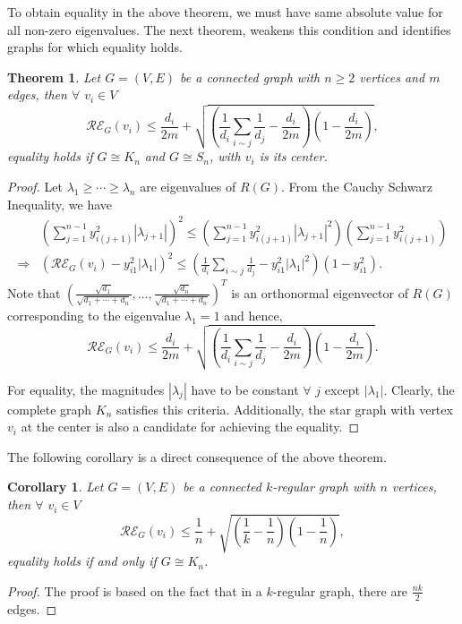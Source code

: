 \documentclass[10 pt]{article}
\newtheorem{theorem}{Theorem}[section]
\newtheorem{corollary}{Corollary}[section]
\numberwithin{equation}{section}
\begin{document}
To obtain equality in the above theorem, we must have same absolute value for all non-zero eigenvalues. The next theorem, weakens this condition and identifies graphs for which equality holds.
\begin{theorem}
Let $G=(V,E)$ be a connected graph with $n\geq 2$ vertices and $m$ edges, then $\forall$ $v_i\in V$
$$\mathcal{RE}_G(v_i)\leq \frac{d_i}{2m}+\sqrt{\left(\frac{1}{d_i}\sum\limits_{i\sim j}\frac{1}{d_j}-\frac{d_i}{2m}\right)\left(1-\frac{d_i}{2m}\right)},$$
equality holds if $G\cong K_n$ and $G\cong S_n$, with $v_i$ is its center.
\end{theorem}
\begin{proof}
Let $\lambda_1 \geq \cdots \geq \lambda_n$ are eigenvalues of $R(G)$. From the Cauchy Schwarz Inequality, we have
\begin{align*}
&\left(\sum\limits_{j=1}^{n-1}y^2_{i(j+1)}|\lambda_{j+1}|\right)^2\leq \left(\sum\limits_{j=1}^{n-1}y^2_{i(j+1)}|\lambda_{j+1}|^2\right)\left(\sum\limits_{j=1}^{n-1}y^2_{i(j+1)}\right)\\
\Rightarrow &\left(\mathcal{RE}_G(v_i)-y^2_{i1}|\lambda_{1}|\right)^2\leq \left(\frac{1}{d_i}\sum\limits_{i\sim j}\frac{1}{d_j}-y^2_{i1}|\lambda_{1}|^2\right)\left(1-y^2_{i1}\right).
\end{align*}
Note that $\left(\frac{\sqrt{d_1}}{\sqrt{d_1+\cdots+d_n}},\ldots,\frac{\sqrt{d_n}}{\sqrt{d_1+\cdots+d_n}}\right)^T$ is an orthonormal eigenvector of $R(G)$ corresponding to the eigenvalue $\lambda_1=1$ and hence,
$$\mathcal{RE}_G(v_i)\leq \frac{d_i}{2m}+\sqrt{\left(\frac{1}{d_i}\sum\limits_{i\sim j}\frac{1}{d_j}-\frac{d_i}{2m}\right)\left(1-\frac{d_i}{2m}\right)}.$$

For equality, the magnitudes $|\lambda_{j}|$ have to be constant $\forall$ $j$ except $|\lambda_1|$. Clearly, the complete graph $K_n$ satisfies this criteria. Additionally, the star graph with vertex $v_i$ at the center is also a candidate for achieving the equality.
\end{proof}

The following corollary is a direct consequence of the above theorem.

\begin{corollary}
Let $G=(V,E)$ be a connected $k$-regular graph with $n$ vertices, then $\forall$ $v_i\in V$
$$\mathcal{RE}_G(v_i)\leq \frac{1}{n}+\sqrt{\left(\frac{1}{k}-\frac{1}{n}\right)\left(1-\frac{1}{n}\right)},$$
equality holds if and only if $G\cong K_n$.
\end{corollary}
\begin{proof}
The proof is based on the fact that in a $k$-regular graph, there are $\frac{nk}{2}$ edges.
\end{proof}
\end{document}
